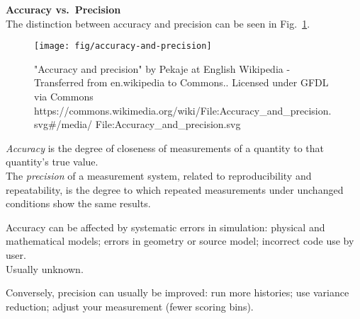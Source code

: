 \documentclass[12pt]{article}
\begin{document}
\textbf{Accuracy vs.\ Precision}\\
The distinction between accuracy and precision can be seen in Fig.~\ref{fig:accuracy}.\\
%
\begin{figure}[h!]
\begin{center}
  \texttt{[image: fig/accuracy-and-precision]}
\end{center}
  \caption{"Accuracy and precision" by Pekaje at English Wikipedia - Transferred from en.wikipedia to Commons.. Licensed under GFDL via Commons https://commons.wikimedia.org/wiki/File:Accuracy\_and\_precision.svg\#/media/
  File:Accuracy\_and\_precision.svg}
  \label{fig:accuracy}
\end{figure}
%
\textit{Accuracy} is the degree of closeness of measurements of a quantity to that quantity's true value.\\
The \textit{precision} of a measurement system, related to reproducibility and repeatability, is the degree to which repeated measurements under unchanged conditions show the same results.

Accuracy can be affected by systematic errors in simulation: physical and mathematical models; errors in geometry or source model; incorrect code use by user.\\
Usually unknown.

Conversely, precision can usually be improved: run more histories; use variance reduction; adjust your measurement (fewer scoring bins).
\end{document}
